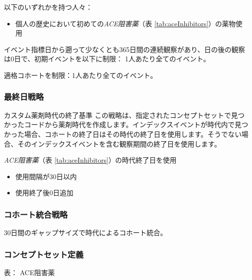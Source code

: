 \documentclass[
  11pt]{book}
\providecommand{\tightlist}{%
  \setlength{\itemsep}{0pt}\setlength{\parskip}{0pt}}
\theoremstyle{definition}
\theoremstyle{definition}
\theoremstyle{definition}
\theoremstyle{definition}
\theoremstyle{remark}
\begin{document}
以下のいずれかを持つ人々：

\begin{itemize}
\tightlist
\item
  個人の歴史において初めての\emph{ACE阻害薬}（表 \ref{tab:aceInhibitors}）の薬物使用
\end{itemize}

イベント指標日から遡って少なくとも365日間の連続観察があり、日の後の観察は0日で、初期イベントを以下に制限： 1人あたり全てのイベント。

適格コホートを制限：1人あたり全てのイベント。

\subsubsection*{最終日戦略}\label{ux6700ux7d42ux65e5ux6226ux7565}

カスタム薬剤時代の終了基準
この戦略は、指定されたコンセプトセットで見つかったコードから薬剤時代を作成します。インデックスイベントが時代内で見つかった場合、コホートの終了日はその時代の終了日を使用します。そうでない場合、そのインデックスイベントを含む観察期間の終了日を使用します。

\emph{ACE阻害薬}（表 \ref{tab:aceInhibitors}）の時代終了日を使用

\begin{itemize}
\tightlist
\item
  使用間隔が30日以内
\item
  使用終了後0日追加
\end{itemize}

\subsubsection*{コホート統合戦略}\label{ux30b3ux30dbux30fcux30c8ux7d71ux5408ux6226ux7565}

30日間のギャップサイズで時代によるコホート統合。

\subsubsection*{コンセプトセット定義}\label{ux30b3ux30f3ux30bbux30d7ux30c8ux30bbux30c3ux30c8ux5b9aux7fa9}

表： \label{tab:aceInhibitors} ACE阻害薬
\end{document}
